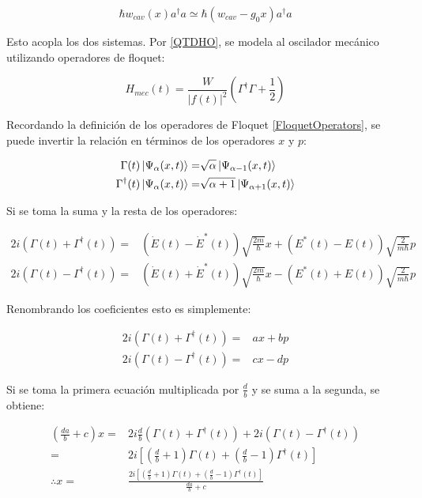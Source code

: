 \documentclass[a4paper,10pt]{report}
\begin{document}
\begin{equation}
\hbar w_{cav}(x) a^\dagger a \simeq \hbar(w_{cav}-g_0x)a^\dagger a
\end{equation}

Esto acopla los dos sistemas. Por \ref{QTDHO}, se modela al oscilador mecánico utilizando operadores de floquet:

\begin{equation}
H_{mec}(t) = \frac{W}{|f(t)|^2}(\Gamma^\dagger \Gamma + \frac{1}{2})
\end{equation}

Recordando la definición de los operadores de Floquet \ref{FloquetOperators}, se puede invertir la relación en términos de los operadores $x$ y $p$:


\begin{align*}
\Gamma(t) \Ket{\Psi_\alpha (x,t)} =& \sqrt{\alpha}\Ket{\Psi_{\alpha-1} (x,t)} \\
\Gamma^\dagger(t) \Ket{\Psi_\alpha (x,t)} =& \sqrt{\alpha+1}\Ket{\Psi_{\alpha+1} (x,t)}
\end{align*}

Si se toma la suma y la resta de los operadores:

\begin{align*}
2i(\Gamma (t) + \Gamma ^\dagger (t)) =& (\dot{E} (t) - \dot{E}^* (t)) \sqrt{\frac{2m}{\hbar}}x + (E^* (t) - E (t))\sqrt{\frac{2}{m\hbar}} p \\
2i(\Gamma (t) - \Gamma ^\dagger (t)) =& (\dot{E} (t) + \dot{E}^* (t)) \sqrt{\frac{2m}{\hbar}}x -(E^* (t) + E (t))\sqrt{\frac{2}{m\hbar}} p
\end{align*}

Renombrando los coeficientes esto es simplemente:

\begin{align*}
2i(\Gamma (t) + \Gamma ^\dagger (t)) =& ax + bp \\
2i(\Gamma (t) - \Gamma ^\dagger (t)) =& cx - dp
\end{align*}

Si se toma la primera ecuación multiplicada por $\frac{d}{b}$ y se suma a la segunda, se obtiene:

\begin{align*}
(\frac{da}{b}+c)x =& 2i \frac{d}{b}(\Gamma (t) + \Gamma ^\dagger (t)) + 2i(\Gamma (t) - \Gamma ^\dagger (t)) \\
=&2i[(\frac{d}{b}+1)\Gamma (t)+(\frac{d}{b}-1)\Gamma^\dagger (t)]\\
\therefore x =& \frac{2i[(\frac{d}{b}+1)\Gamma (t)+(\frac{d}{b}-1)\Gamma^\dagger (t)]}{\frac{da}{b}+c}
\end{align*}
\end{document}
